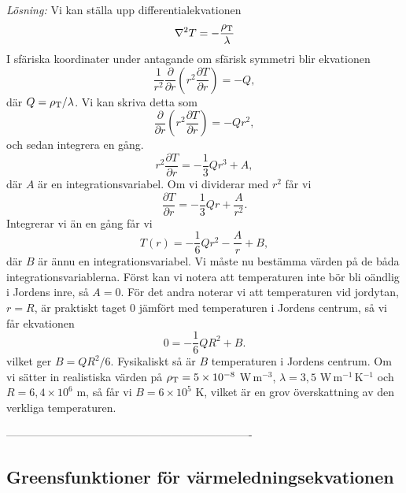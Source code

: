 \documentclass[%
oneside,                 %
final,                   %
10pt]{article}
\begin{document}
\emph{Lösning:}  Vi kan ställa upp differentialekvationen
\begin{equation}
  \nabla^2T = - \frac{\rho_{\rm T}}{\lambda}
\end{equation}
I sfäriska koordinater under antagande om sfärisk symmetri blir ekvationen
\begin{equation}
  \frac{1}{r^2} \frac{\partial}{\partial r}\left(r^2 \frac{\partial T}
{\partial r}\right) = -Q,
\end{equation}
där $Q = \rho_{\rm T}/\lambda$.  Vi kan skriva detta som
\begin{equation}
  \frac{\partial}{\partial r}\left(r^2 \frac{\partial T}
{\partial r}\right) = -Q r^2,
\end{equation}
och sedan integrera en gång.
\begin{equation}
  r^2 \frac{\partial T}{\partial r} = -\frac{1}{3}Qr^3 + A,
\end{equation}
där $A$ är en integrationsvariabel.  Om vi dividerar med $r^2$ får vi
\begin{equation}
  \frac{\partial T}{\partial r} = -\frac{1}{3}Qr + \frac{A}{r^2}.
\end{equation}
Integrerar vi än en gång får vi
\begin{equation}
  T\left(r\right) = - \frac{1}{6} Q r^2 - \frac{A}{r} + B,
\end{equation}
där $B$ är ännu en integrationsvariabel.  Vi måste nu bestämma
värden på de båda integrationsvariablerna.  Först kan vi notera
att temperaturen inte bör bli oändlig i Jordens inre, så $A = 0$.
För det andra noterar vi att temperaturen vid jordytan, $r = R$, är 
praktiskt taget 0 jämfört med temperaturen i Jordens centrum, så vi
får ekvationen
\begin{equation}
  0 = -\frac{1}{6} Q R^2 + B.
\end{equation}
vilket ger $B = QR^2/6$. Fysikaliskt så är $B$ temperaturen i Jordens centrum.  Om vi sätter in realistiska värden på $\rho_{\rm T} = 5\times
10^{-8}$ W\,m$^{-3}$, $\lambda = 3,5$ W\,m$^{-1}$\,K$^{-1}$ och $R = 6,4\times
10^6$ m, så får vi $B = 6\times 10^5$ K, vilket är en grov
överskattning av den verkliga temperaturen.

-------------------------------------------------------------------

\subsection{Greensfunktioner för värmeledningsekvationen}
\end{document}
